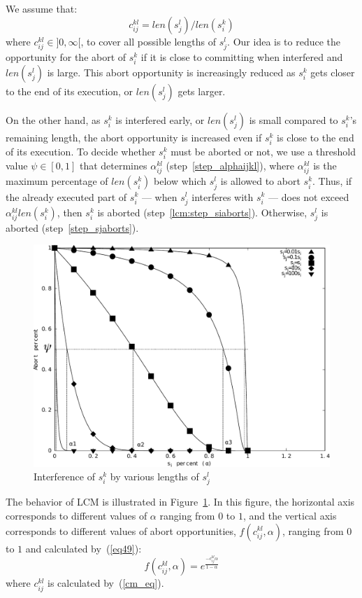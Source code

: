 We assume that:
\begin{equation}
c_{ij}^{kl}=len(s_{j}^{l})/len(s_{i}^{k})
\label{cm_eq}\end{equation}
where $c_{ij}^{kl}\in]0,\infty[$, to cover all possible lengths of $s_{j}^{l}$.
Our idea is to reduce the opportunity for the abort of $s_{i}^{k}$ if it is close to committing when interfered and $len(s_{j}^{l})$ is large. This abort opportunity is increasingly reduced as $s_{i}^{k}$ gets closer to the end of its execution, or $len(s_{j}^{l})$ gets larger. 

On the other hand, as $s_{i}^{k}$ is interfered early,
or $len(s_{j}^{l})$ is small compared to $s_{i}^{k}$'s remaining length, the abort opportunity 
is increased even if $s_i^k$ is close to the end of its execution. To decide whether $s_{i}^{k}$ must be aborted or not, we use a threshold value $\psi\in[0,1]$ that determines $\alpha_{ij}^{kl}$ (step~\ref{step_alphaijkl}), where $\alpha_{ij}^{kl}$ is the maximum percentage of $len(s_i^k)$ below which $s_j^l$ is allowed to abort $s_i^k$. Thus, if the already executed part of $s_i^k$ --- when $s_j^l$ interferes with $s_i^k$ --- does not exceed $\alpha_{ij}^{kl}len(s_i^k)$, then $s_i^k$ is aborted (step~\ref{lcm:step_siaborts}). Otherwise, $s_j^l$ is aborted (step~\ref{step_sjaborts}).
%
\begin{figure}[htbp]
\centering
\includegraphics[scale=0.4]{figures/figure16}
\caption{\label{fig16}Interference of $s_{i}^{k}$ by various lengths of 
$s_{j}^{l}$}
\end{figure}

The behavior of LCM is illustrated in Figure~\ref{fig16}. In this figure, the horizontal axis corresponds to different values of $\alpha$ ranging from $0$ to $1$, and the vertical axis corresponds to different values of abort opportunities, $f(c_{ij}^{kl},\alpha)$, ranging from $0$ to $1$ and calculated by~(\ref{eq49}):
\begin{equation}
f(c_{ij}^{kl},\alpha)=e^{\frac{-c_{ij}^{kl}\alpha}{1-\alpha}}
\label{eq49}\end{equation}
where $c_{ij}^{kl}$ is calculated by~(\ref{cm_eq}).

